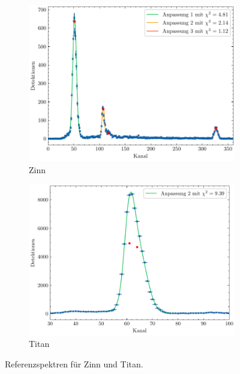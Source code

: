 \begin{figure}[H]
    \centering
    \begin{subfigure}{0.45\textwidth}
        \centering
        \includegraphics[width=\linewidth]{../figs/Sn}
        \caption{Zinn}
    \end{subfigure}
    \begin{subfigure}{0.45\textwidth}
        \centering
        \includegraphics[width=\linewidth]{../figs/Titan}
        \caption{Titan}
    \end{subfigure}
    \caption{Referenzspektren für Zinn und Titan.}\label{fig:sn_ti}
\end{figure}
